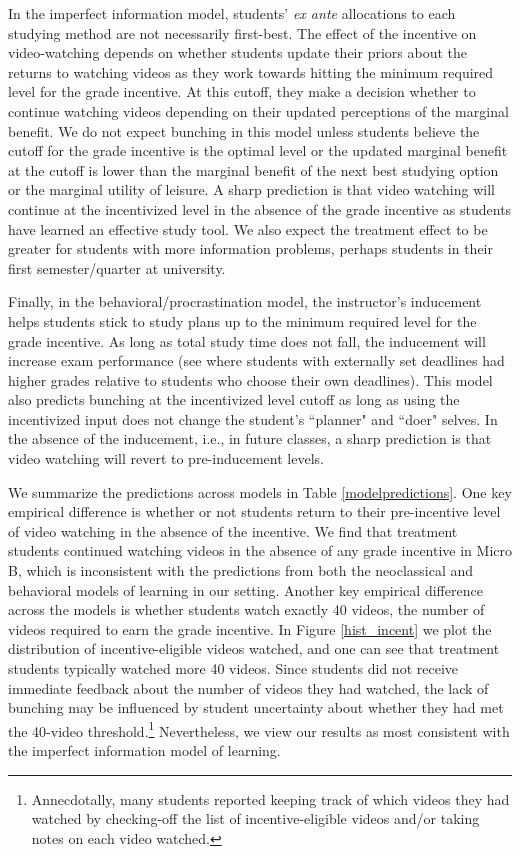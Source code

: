 \documentclass[12pt]{article}
\begin{document}
In the imperfect information model, students' \textit{ex ante} allocations to each studying method are not necessarily first-best. The effect of the incentive on video-watching depends on whether students update their priors about the returns to watching videos as they work towards hitting the minimum required level for the grade incentive. At this cutoff, they make a decision whether to continue watching videos depending on their updated perceptions of the marginal benefit. We do not expect bunching in this model unless students believe the cutoff for the grade incentive is the optimal level or the updated marginal benefit at the cutoff is lower than the marginal benefit of the next best studying option or the marginal utility of leisure. A sharp prediction is that video watching will continue at the incentivized level in the absence of the grade incentive as students have learned an effective study tool. We also expect the treatment effect to be greater for students with more information problems, perhaps students in their first semester/quarter at university.

Finally, in the behavioral/procrastination model, the instructor's inducement helps students stick to study plans up to the minimum required level for the grade incentive. As long as total study time does not fall, the inducement will increase exam performance (see \textcite{aw2002} where students with externally set deadlines had higher grades relative to students who choose their own deadlines). This model also predicts bunching at the incentivized level cutoff as long as using the incentivized input does not change the student's ``planner" and ``doer" selves. In the absence of the inducement, i.e., in future classes, a sharp prediction is that video watching will revert to pre-inducement levels.

We summarize the predictions across models in Table \ref{modelpredictions}. One key empirical difference is whether or not students return to their pre-incentive level of video watching in the absence of the incentive. We find that treatment students continued watching videos in the absence of any grade incentive in Micro B, which is inconsistent with the predictions from both the neoclassical and behavioral models of learning in our setting. Another key empirical difference across the models is whether students watch exactly 40 videos, the number of videos required to earn the grade incentive. In Figure \ref{hist_incent} we plot the distribution of incentive-eligible videos watched, and one can see that treatment students typically watched more 40 videos. Since students did not receive immediate feedback about the number of videos they had watched, the lack of bunching may be influenced by student uncertainty about whether they had met the 40-video threshold.\footnote{Annecdotally, many students reported keeping track of which videos they had watched by checking-off the list of incentive-eligible videos and/or taking notes on each video watched.} Nevertheless, we view our results as most consistent with the imperfect information model of learning.
\end{document}
